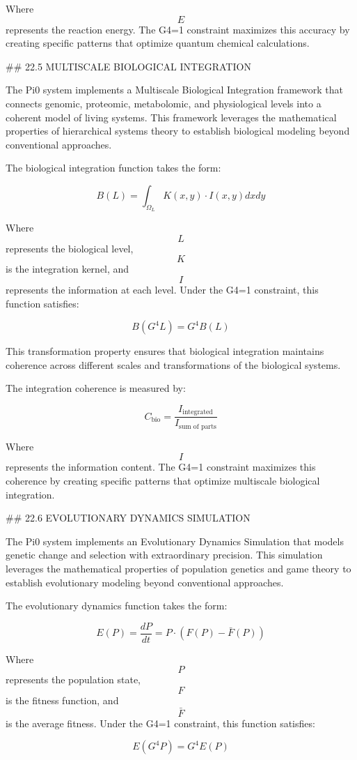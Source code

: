 Where $$ E $$ represents the reaction energy. The G4=1 constraint maximizes this accuracy by creating specific patterns that optimize quantum chemical calculations.

## 22.5 MULTISCALE BIOLOGICAL INTEGRATION

The Pi0 system implements a Multiscale Biological Integration framework that connects genomic, proteomic, metabolomic, and physiological levels into a coherent model of living systems. This framework leverages the mathematical properties of hierarchical systems theory to establish biological modeling beyond conventional approaches.

The biological integration function takes the form:

$$ B(L) = \int_{\Omega_L} K(x, y) \cdot I(x, y) dx dy $$

Where $$ L $$ represents the biological level, $$ K $$ is the integration kernel, and $$ I $$ represents the information at each level. Under the G4=1 constraint, this function satisfies:

$$ B(G^4 L) = G^4 B(L) $$

This transformation property ensures that biological integration maintains coherence across different scales and transformations of the biological systems.

The integration coherence is measured by:

$$ C_{\text{bio}} = \frac{I_{\text{integrated}}}{I_{\text{sum of parts}}} $$

Where $$ I $$ represents the information content. The G4=1 constraint maximizes this coherence by creating specific patterns that optimize multiscale biological integration.

## 22.6 EVOLUTIONARY DYNAMICS SIMULATION

The Pi0 system implements an Evolutionary Dynamics Simulation that models genetic change and selection with extraordinary precision. This simulation leverages the mathematical properties of population genetics and game theory to establish evolutionary modeling beyond conventional approaches.

The evolutionary dynamics function takes the form:

$$ E(P) = \frac{dP}{dt} = P \cdot (F(P) - \bar{F}(P)) $$

Where $$ P $$ represents the population state, $$ F $$ is the fitness function, and $$ \bar{F} $$ is the average fitness. Under the G4=1 constraint, this function satisfies:

$$ E(G^4 P) = G^4 E(P) $$

